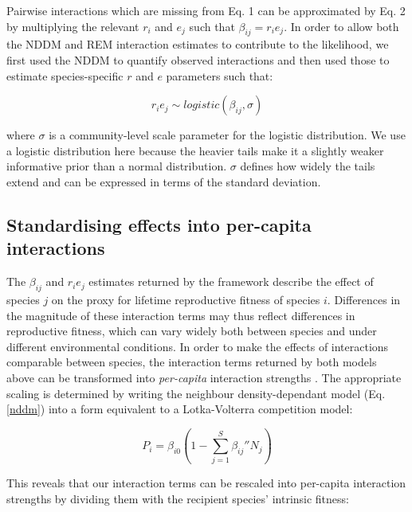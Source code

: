 \documentclass[a4,12pt]{article}
\begin{document}
        Pairwise interactions which are missing from Eq. 1 can be approximated by Eq. 2 by multiplying the relevant $r_{i}$ and $e_{j}$ such that $\beta_{ij} = r_{i} e_{j}$. In order to allow both the NDDM and REM interaction estimates to contribute to the likelihood, we first used the NDDM to quantify observed interactions and then used those to estimate species-specific $r$ and $e$ parameters such that: 
    
        \begin{equation}
        r_i e_j \sim logistic \left ( \beta_{ij}, \sigma \right )
        \label{unrealised}
        \end{equation}
    
        where $\sigma$ is a community-level scale parameter for the logistic distribution. We use a logistic distribution here because the heavier tails make it a slightly weaker informative prior than a normal distribution. $\sigma$ defines how widely the tails extend and can be expressed in terms of the standard deviation. 

    \subsection{Standardising effects into per-capita interactions}

        The $\beta_{ij}$ and $r_i e_j$ estimates returned by the framework describe the effect of species $j$ on the proxy for lifetime reproductive fitness of species $i$. Differences in the magnitude of these interaction terms may thus reflect differences in reproductive fitness, which can vary widely both between species and under different environmental conditions. In order to make the effects of interactions comparable between species, the interaction terms returned by both models above can be transformed into \textit{per-capita} interaction strengths \parencite{Godoy2014, Bimler2018}. The appropriate scaling is determined by writing the neighbour density-dependant model (Eq. \ref{nddm}) into a form equivalent to a Lotka-Volterra competition model: 

        \begin{equation}
        P_{i} = \beta_{i0} \left ( 1 - \sum_{j=1}^{S} {\beta_{ij}}'' N_{j} \right )
        \label{LVform}
        \end{equation}

        This reveals that our interaction terms can be rescaled into per-capita interaction strengths by dividing them with the recipient species' intrinsic fitness:  
\end{document}
